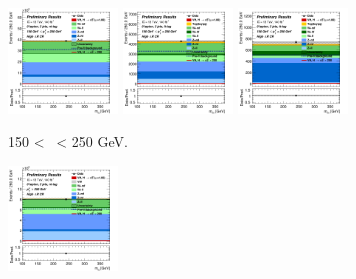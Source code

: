 \vspace*{\fill} 

\begin{figure}[h!]
    \centering
    \begin{subfigure}[b]{\textwidth}
        \centering
        \includegraphics[width=0.32\textwidth]{Images/VH/Own_fit/postfit_VHcc/Region_distmBB_BMax250_BMin150_DCRHigh_J2_TTypent_T1_L0_Y6051_GlobalFit_conditionnal_mu1.png}
        \includegraphics[width=0.32\textwidth]{Images/VH/Own_fit/postfit_VHcc/Region_distmBB_BMax250_BMin150_DCRHigh_J2_TTypelt_T2_L0_Y6051_GlobalFit_conditionnal_mu1.png}
        \includegraphics[width=0.32\textwidth]{Images/VH/Own_fit/postfit_VHcc/Region_distmBB_BMax250_BMin150_DCRHigh_J2_TTypett_T2_L0_Y6051_GlobalFit_conditionnal_mu1.png}
        \caption{150 < \ptv\ < 250 GeV.}
        \label{fig:plots_VHcc_OL_150_CRH_2c_2J}
    \end{subfigure}
    \begin{subfigure}[b]{\textwidth}
        \centering
        \includegraphics[width=0.32\textwidth]{Images/VH/Own_fit/postfit_VHcc/Region_distmBB_BMin250_DCRHigh_J2_TTypent_T1_L0_Y6051_GlobalFit_conditionnal_mu1.png}

\end{subfigure}
\end{figure}
